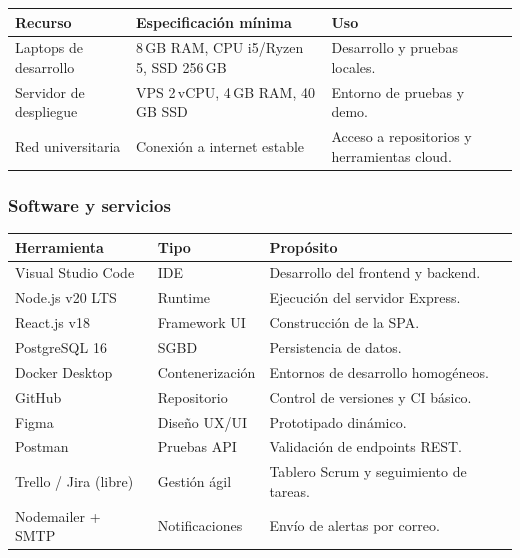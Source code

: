 \begin{center}
\begin{tabular}{p{4.5cm} p{4cm} p{4.5cm}}
  \toprule
  \rowcolor{unsaacRed}
  \color{white}\textbf{Recurso} & \color{white}\textbf{Especificación mínima} &
  \color{white}\textbf{Uso} \\
  \midrule
  Laptops de desarrollo   & 8\,GB RAM, CPU i5/Ryzen 5, SSD 256\,GB &
                            Desarrollo y pruebas locales. \\
  Servidor de despliegue  & VPS 2\,vCPU, 4\,GB RAM, 40\,GB SSD     &
                            Entorno de pruebas y demo. \\
  Red universitaria       & Conexión a internet estable              &
                            Acceso a repositorios y herramientas cloud. \\
  \bottomrule
\end{tabular}
\end{center}

\subsubsection{Software y servicios}

\begin{center}
\begin{tabular}{p{4cm} p{3.5cm} p{5.5cm}}
  \toprule
  \rowcolor{unsaacRed}
  \color{white}\textbf{Herramienta} & \color{white}\textbf{Tipo} &
  \color{white}\textbf{Propósito} \\
  \midrule
  Visual Studio Code      & IDE               & Desarrollo del frontend y backend. \\
  Node.js v20 LTS         & Runtime           & Ejecución del servidor Express. \\
  React.js v18            & Framework UI      & Construcción de la SPA. \\
  PostgreSQL 16           & SGBD              & Persistencia de datos. \\
  Docker Desktop          & Contenerización   & Entornos de desarrollo homogéneos. \\
  GitHub                  & Repositorio       & Control de versiones y CI básico. \\
  Figma                   & Diseño UX/UI      & Prototipado dinámico. \\
  Postman                 & Pruebas API       & Validación de endpoints REST. \\
  Trello / Jira (libre)   & Gestión ágil      & Tablero Scrum y seguimiento de tareas. \\
  Nodemailer + SMTP       & Notificaciones    & Envío de alertas por correo. \\
  \bottomrule
\end{tabular}
\end{center}

